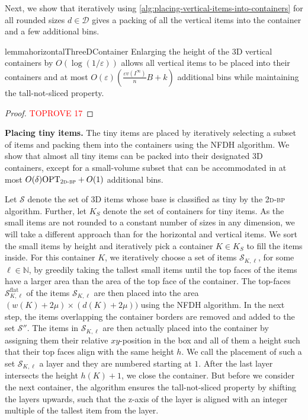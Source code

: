 \documentclass[a4paper,UKenglish,cleveref, autoref, thm-restate]{lipics-v2021}
\newcommand{\eps}{\varepsilon}
\newcommand{\opt}{\mathrm{OPT}}
\newcommand{\twobp}{\textsc{2d-bp}\xspace}
\newcommand{\tin}{tiny\xspace}
\begin{document}
Next, we show that iteratively using \cref{alg:placing-vertical-items-into-containers} for all rounded sizes $d \in \mathcal{D}$ gives a packing of all the vertical items into the container and a few additional bins.


\begin{restatable}{lemma}{horizontalThreeDContainer}
Enlarging the height of the 3D vertical containers by $O(\log(1/\eps))$ allows all vertical items to be placed into their containers and at most $O(\eps)(\frac{\eps v(I^{\infty})}{n} B+k)$ additional bins while maintaining the tall-not-sliced property. 
\end{restatable}

\begin{proof}\textcolor{red}{TOPROVE 17}\end{proof}

\noindent \textbf{Placing \tin items.}
The \tin items are placed by iteratively selecting a subset of items and packing them into the containers using the NFDH algorithm.
We show that almost all \tin items can be packed into their designated 3D containers, except for a small-volume subset that can be accommodated in at most $O(\delta)\opt_{\twobp}+O(1)$ additional bins. 

Let $\mathcal{S}$ denote the set of 3D items whose base is classified as \tin by the \twobp algorithm.
Further, let $K_S$ denote the set of containers for \tin items.
As the small items are not rounded to a constant number of sizes in any dimension, we will take a different approach than for the horizontal and vertical items.
We sort the small items by height and iteratively pick a container $K \in K_S$ to fill the items inside.
For this container $K$, we iteratively choose a set of items $\mathcal{S}_{K,\ell}$, for some $\ell \in \mathbb{N}$, by greedily taking the tallest small items until the top faces of the items have a larger area than the area of the top face of the container.
The top-faces $\mathcal{S}_{K,\ell}^{\mathrm{flat}}$ of the items $\mathcal{S}_{K,\ell}$ are then placed into the area $(w(K) +2\mu) \times (d(K)+2\mu))$ using the NFDH algorithm.
In the next step, the items overlapping the container borders are removed and added to the set $\mathcal{S}''$.
The items in $\mathcal{S}_{K,\ell}$ are then actually placed into the container by assigning them their relative $xy$-position in the box and all of them a height such that their top faces align with the same height $h$.
We call the placement of such a set $\mathcal{S}_{K,\ell}$ a layer and they are numbered starting at $1$.
After the last layer intersects the height $h(K)+1$, we close the container. But before we consider the next container, the algorithm ensures the tall-not-sliced property by shifting the layers upwards, such that the z-axis of the layer is aligned with an integer multiple of the tallest item from the layer.
\end{document}
